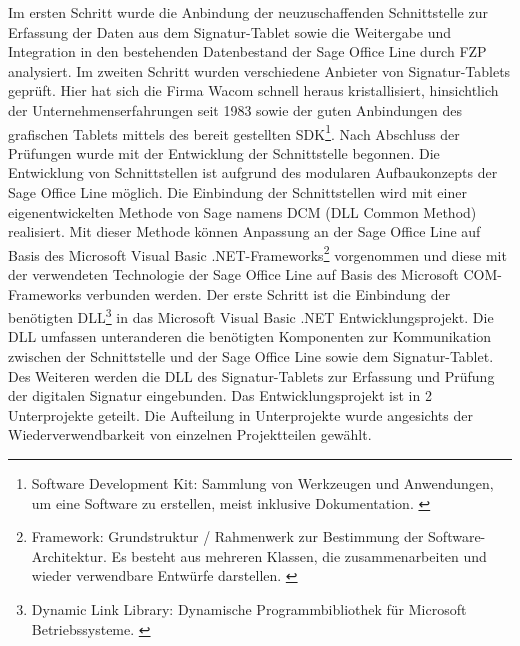 Im ersten Schritt wurde die Anbindung der neuzuschaffenden Schnittstelle 
zur Erfassung der Daten aus dem Signatur-Tablet sowie die Weitergabe 
und Integration in den bestehenden Datenbestand der Sage Office Line 
durch FZP analysiert. Im zweiten Schritt wurden verschiedene Anbieter 
von Signatur-Tablets geprüft. Hier hat sich die Firma Wacom schnell 
heraus kristallisiert, hinsichtlich der Unternehmenserfahrungen seit 
1983 \cite{konzept1} sowie der guten Anbindungen des grafischen 
Tablets mittels des bereit gestellten SDK\footnote{\label{foot:4}Software 
Development Kit: Sammlung von Werkzeugen und Anwendungen, um eine Software 
zu erstellen, meist inklusive Dokumentation. \cite{SDK}}. Nach Abschluss 
der Prüfungen wurde mit der Entwicklung der Schnittstelle begonnen.
\newline
Die Entwicklung von Schnittstellen ist aufgrund des modularen Aufbaukonzepts der Sage Office Line möglich. Die Einbindung der Schnittstellen wird mit einer eigenentwickelten Methode von Sage namens DCM (DLL Common Method) realisiert. Mit dieser Methode können Anpassung an der Sage Office Line auf Basis des Microsoft Visual Basic .NET-Frameworks\footnote{\label{foot:5}Framework: Grundstruktur / Rahmenwerk zur Bestimmung der 
Software-Architektur. Es besteht aus mehreren Klassen, die zusammenarbeiten und wieder verwendbare Entwürfe darstellen. \cite{framework}}
vorgenommen und diese mit der verwendeten Technologie der Sage Office Line auf Basis des Microsoft COM-Frameworks verbunden werden.
\newline
Der erste Schritt ist die Einbindung der benötigten DLL\footnote{\label{foot:6}Dynamic Link Library: Dynamische Programmbibliothek für Microsoft Betriebssysteme. \cite{DLL}} in das Microsoft Visual Basic .NET Entwicklungsprojekt. Die DLL umfassen unteranderen die benötigten Komponenten zur Kommunikation zwischen der Schnittstelle und der Sage Office Line sowie dem Signatur-Tablet. Des Weiteren werden die DLL des Signatur-Tablets zur Erfassung und Prüfung der digitalen Signatur eingebunden. Das Entwicklungsprojekt ist in 2 Unterprojekte geteilt. Die Aufteilung in Unterprojekte wurde angesichts der Wiederverwendbarkeit von einzelnen Projektteilen gewählt.
\newline
